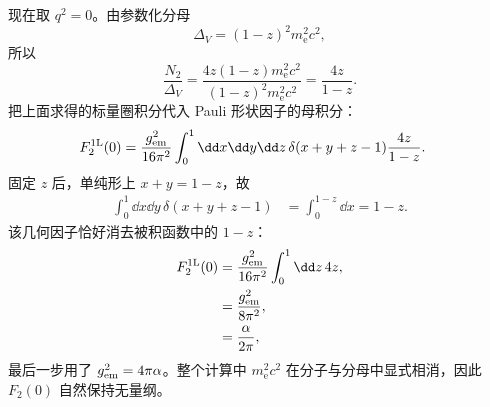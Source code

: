 \begin{derivation}
现在取 $q^2=0$。由参数化分母
\begin{equation*}
 \Delta_V=(1-z)^2m_{\mathrm e}^2c^2,
\end{equation*}
所以
\begin{equation*}
 \frac{N_2}{\Delta_V}
 =\frac{4z(1-z)m_{\mathrm e}^2c^2}{(1-z)^2m_{\mathrm e}^2c^2}
 =\frac{4z}{1-z}.
\end{equation*}
把上面求得的标量圈积分代入 Pauli 形状因子的母积分：
\begin{align*}
 F_2^{\rm 1L}(0)
 &=\frac{g_{\rm em}^2}{16\pi^2}
 \int_0^1\dd x\dd y\dd z\,
 \delta(x+y+z-1)
 \frac{4z}{1-z}.
\end{align*}
固定 $z$ 后，单纯形上 $x+y=1-z$，故
\begin{align*}
 \int_0^1\dd x\dd y\,
 \delta(x+y+z-1)
 &=\int_0^{1-z}\dd x=1-z.
\end{align*}
该几何因子恰好消去被积函数中的 $1-z$：
\begin{align*}
 F_2^{\rm 1L}(0)
 &=\frac{g_{\rm em}^2}{16\pi^2}
 \int_0^1\dd z\,4z,\\
 &=\frac{g_{\rm em}^2}{8\pi^2},\\
 &={\frac{\alpha}{2\pi}},
 \end{align*}
最后一步用了 $g_{\rm em}^2=4\pi\alpha$。整个计算中 $m_{\mathrm e}^2c^2$ 在分子与分母中显式相消，因此 $F_2(0)$ 自然保持无量纲。
\end{derivation}

